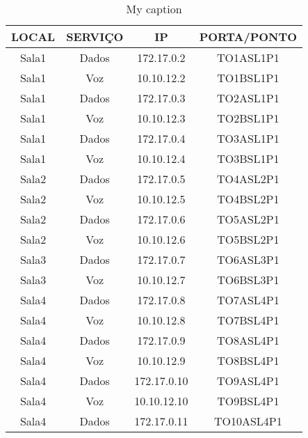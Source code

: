 \begin{table}[]
	\centering
	\caption{My caption}
	\label{my-label}
	\begin{tabular}{cccc}
		\hline
		\textbf{LOCAL} & \textbf{SERVIÇO} & \textbf{IP} & \textbf{PORTA/PONTO} \\ \hline
		Sala1          & Dados            & 172.17.0.2  & TO1ASL1P1            \\ \hline
		Sala1          & Voz              & 10.10.12.2  & TO1BSL1P1            \\ \hline
		Sala1          & Dados            & 172.17.0.3  & TO2ASL1P1            \\ \hline
		Sala1          & Voz              & 10.10.12.3  & TO2BSL1P1            \\ \hline
		Sala1          & Dados            & 172.17.0.4  & TO3ASL1P1            \\ \hline
		Sala1          & Voz              & 10.10.12.4  & TO3BSL1P1            \\ \hline
		Sala2          & Dados            & 172.17.0.5  & TO4ASL2P1            \\ \hline
		Sala2          & Voz              & 10.10.12.5  & TO4BSL2P1            \\ \hline
		Sala2          & Dados            & 172.17.0.6  & TO5ASL2P1            \\ \hline
		Sala2          & Voz              & 10.10.12.6  & TO5BSL2P1            \\ \hline
		Sala3          & Dados            & 172.17.0.7  & TO6ASL3P1            \\ \hline
		Sala3          & Voz              & 10.10.12.7  & TO6BSL3P1            \\ \hline
		Sala4          & Dados            & 172.17.0.8  & TO7ASL4P1            \\ \hline
		Sala4          & Voz              & 10.10.12.8  & TO7BSL4P1            \\ \hline
		Sala4          & Dados            & 172.17.0.9  & TO8ASL4P1            \\ \hline
		Sala4          & Voz              & 10.10.12.9  & TO8BSL4P1            \\ \hline
		Sala4          & Dados            & 172.17.0.10 & TO9ASL4P1            \\ \hline
		Sala4          & Voz              & 10.10.12.10 & TO9BSL4P1            \\ \hline
		Sala4          & Dados            & 172.17.0.11 & TO10ASL4P1           \\ \hline

\end{tabular}
\end{table}
